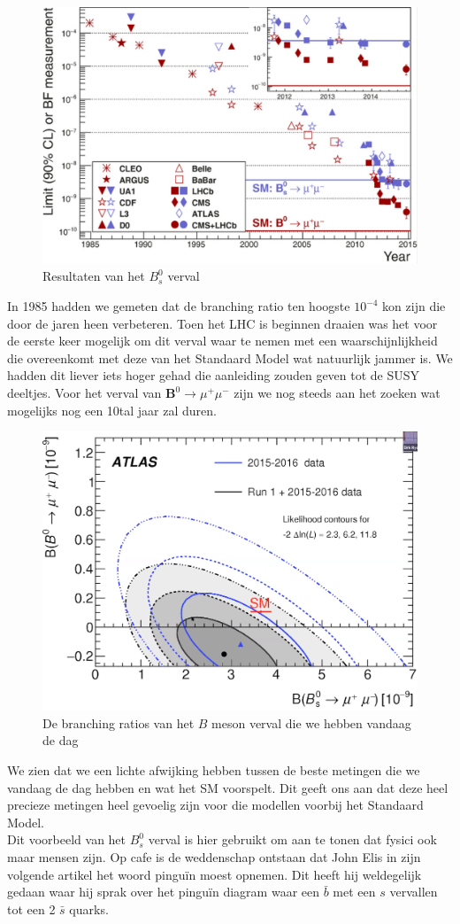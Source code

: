 \documentclass[../main.tex]{subfiles}
\begin{document}
\begin{figure}[h]
    \centering
    \includegraphics[width=0.6\linewidth]{physics_beyond_the_standard_model/bs_meson_verval_resultaten.png}
    \caption{Resultaten van het $B_s^0$ verval}%
    \label{fig:physics_beyond_the_standard_model/bs_meson_verval_resultaten}
\end{figure}

In 1985 hadden we gemeten dat de branching ratio ten hoogste $10^{-4}$ kon zijn die door de jaren heen verbeteren. Toen het LHC is beginnen draaien was het voor de eerste keer mogelijk om dit verval waar te nemen met een waarschijnlijkheid die overeenkomt met deze van het Standaard Model wat natuurlijk jammer is. We hadden dit liever iets hoger gehad die aanleiding zouden geven tot de SUSY deeltjes. Voor het verval van $\mathbf{B}^{0} \rightarrow \mu^{+} \mu^-$ zijn we nog steeds aan het zoeken wat mogelijks nog een 10tal jaar zal duren.

\begin{figure}[h]
    \centering
    \includegraphics[width=0.6\linewidth]{physics_beyond_the_standard_model/bs_meson_resultaten_vandaag.png}
    \caption{De branching ratios van het $B$ meson verval die we hebben vandaag de dag}%
    \label{fig:physics_beyond_the_standard_model/bs_meson_resultaten_vandaag}
\end{figure}

We zien dat we een lichte afwijking hebben tussen de beste metingen die we vandaag de dag hebben en wat het SM voorspelt. Dit geeft ons aan dat deze heel precieze metingen heel gevoelig zijn voor die modellen voorbij het Standaard Model.\\
Dit voorbeeld van het $B_s^0$ verval is hier gebruikt om aan te tonen dat fysici ook maar mensen zijn. Op cafe is de weddenschap ontstaan dat John Elis in zijn volgende artikel het woord pinguïn moest opnemen. Dit heeft hij weldegelijk gedaan waar hij sprak over het pinguïn diagram waar een $\bar{b}$ met een $s$ vervallen tot een 2 $\bar{s}$ quarks.
\end{document}
